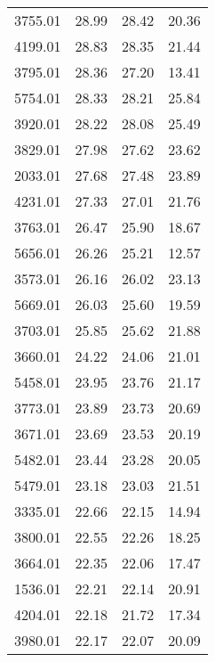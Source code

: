 \begin{table}
\begin{tabular}{rrrr}
3755.01 &            28.99 &            28.42 &            20.36 \\
4199.01 &            28.83 &            28.35 &            21.44 \\
3795.01 &            28.36 &            27.20 &            13.41 \\
5754.01 &            28.33 &            28.21 &            25.84 \\
3920.01 &            28.22 &            28.08 &            25.49 \\
3829.01 &            27.98 &            27.62 &            23.62 \\
2033.01 &            27.68 &            27.48 &            23.89 \\
4231.01 &            27.33 &            27.01 &            21.76 \\
3763.01 &            26.47 &            25.90 &            18.67 \\
5656.01 &            26.26 &            25.21 &            12.57 \\
3573.01 &            26.16 &            26.02 &            23.13 \\
5669.01 &            26.03 &            25.60 &            19.59 \\
3703.01 &            25.85 &            25.62 &            21.88 \\
3660.01 &            24.22 &            24.06 &            21.01 \\
5458.01 &            23.95 &            23.76 &            21.17 \\
3773.01 &            23.89 &            23.73 &            20.69 \\
3671.01 &            23.69 &            23.53 &            20.19 \\
5482.01 &            23.44 &            23.28 &            20.05 \\
5479.01 &            23.18 &            23.03 &            21.51 \\
3335.01 &            22.66 &            22.15 &            14.94 \\
3800.01 &            22.55 &            22.26 &            18.25 \\
3664.01 &            22.35 &            22.06 &            17.47 \\
1536.01 &            22.21 &            22.14 &            20.91 \\
4204.01 &            22.18 &            21.72 &            17.34 \\
3980.01 &            22.17 &            22.07 &            20.09 \\

\end{tabular}
\end{table}
